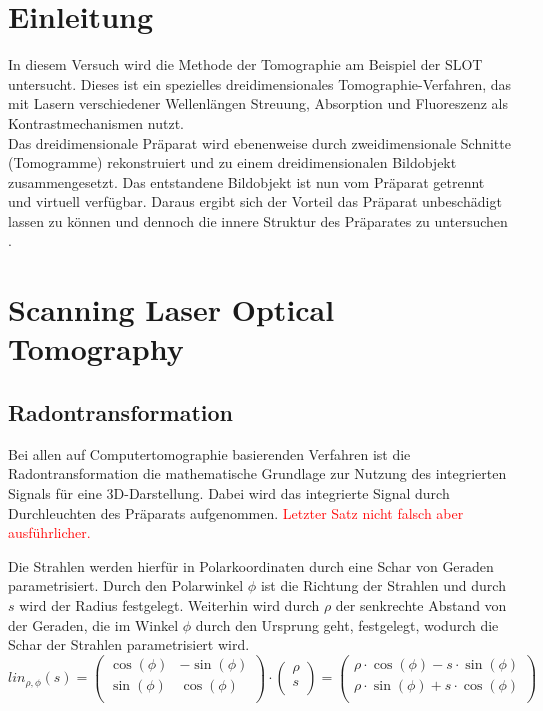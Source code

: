 



\section{Einleitung}
In diesem Versuch wird die Methode der Tomographie am Beispiel der SLOT \\ \glqq {}\grqq{} untersucht. Dieses ist ein spezielles dreidimensionales Tomographie-Verfahren, das mit Lasern verschiedener Wellenlängen  Streuung, Absorption und Fluoreszenz als Kontrastmechanismen nutzt.\\

Das dreidimensionale Präparat wird ebenenweise durch zweidimensionale Schnitte (Tomogramme) rekonstruiert und zu einem dreidimensionalen Bildobjekt zusammengesetzt. Das entstandene Bildobjekt ist nun vom Präparat getrennt und virtuell verfügbar. Daraus ergibt sich der Vorteil das Präparat unbeschädigt lassen zu können und dennoch die innere Struktur des Präparates zu untersuchen \cite{Anleitung}.\\

\section{Scanning Laser Optical Tomography}

\subsection{Radontransformation}
Bei allen auf Computertomographie basierenden Verfahren ist die Radontransformation die mathematische Grundlage zur Nutzung des integrierten Signals für eine 3D-Darstellung. Dabei wird das integrierte Signal durch Durchleuchten des Präparats aufgenommen.
\textcolor{red}{Letzter Satz nicht falsch aber ausführlicher.}

Die Strahlen werden hierfür in Polarkoordinaten durch eine Schar von Geraden parametrisiert. Durch den Polarwinkel $\phi$ ist die Richtung der Strahlen und durch $s$ wird der \glqq Radius\grqq{} festgelegt. Weiterhin wird durch $\rho$ der senkrechte Abstand von der Geraden, die im Winkel $\phi$ durch den Ursprung geht, festgelegt, wodurch die Schar der Strahlen parametrisiert wird.  
\begin{equation}
lin_{\rho,\phi}(s) = \begin{pmatrix}
\cos(\phi) & -\sin(\phi)  \\
\sin(\phi) & \cos(\phi) \\
\end{pmatrix}
\cdot
\begin{pmatrix}
\rho \\
s \\
\end{pmatrix}
 =
\begin{pmatrix}
\rho \cdot \cos(\phi) - s \cdot \sin(\phi) \\
\rho \cdot \sin(\phi) + s \cdot \cos(\phi) \\
\end{pmatrix}
\end{equation}

